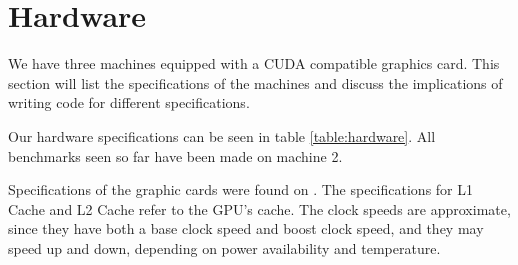 \section{Hardware}\label{sect:hardware}

We have three machines equipped with a CUDA compatible graphics card. This section will list the specifications of the machines and discuss the implications of writing code for different specifications.

Our hardware specifications can be seen in table \ref{table:hardware}. All benchmarks seen so far have been made on machine 2. 

Specifications of the graphic cards were found on \cite{techpowerup:gpu_specs}. The specifications for L1 Cache and L2 Cache refer to the GPU's cache. The clock speeds are approximate, since they have both a base clock speed and boost clock speed, and they may speed up and down, depending on power availability and temperature.

